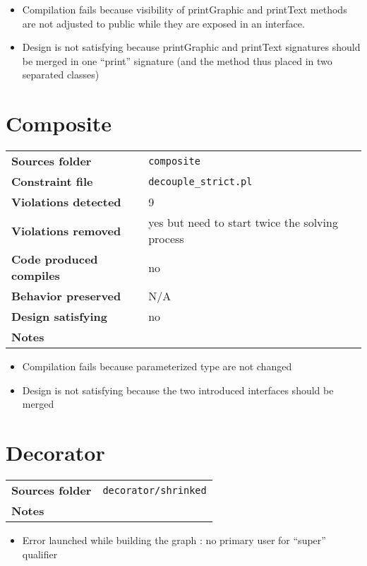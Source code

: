 \documentclass[french]{article}
\begin{document}
\begin{itemize}
\item Compilation fails because visibility of printGraphic and printText methods are not adjusted to public while they are exposed in an interface.
\item Design is not satisfying because printGraphic and printText signatures should be merged in one ``print'' signature (and the method thus placed in two separated classes)
\end{itemize}

\section*{Composite}
\noindent\begin{tabular}{ l p{12cm} }
\textbf{Sources folder} &  \texttt{composite}\\
\textbf{Constraint file} & \texttt{decouple\_strict.pl} \\
\textbf{Violations detected} & 9\\
\textbf{Violations removed} & yes but need to start twice the solving process\\
\textbf{Code produced compiles} & no\\
\textbf{Behavior preserved} & N/A\\
\textbf{Design satisfying} & no\\
\textbf{Notes} & \\
\end{tabular}

\begin{itemize}
\item Compilation fails because parameterized type are not changed
\item Design is not satisfying because the two introduced interfaces should be merged
\end{itemize}


\section*{Decorator}
\noindent\begin{tabular}{ l p{12cm} }
\textbf{Sources folder} &  \texttt{decorator/shrinked}\\
\textbf{Notes} & \\
\end{tabular}

\begin{itemize}
\item Error launched while building the graph : no primary user for ``super'' qualifier
\end{itemize}
\end{document}
